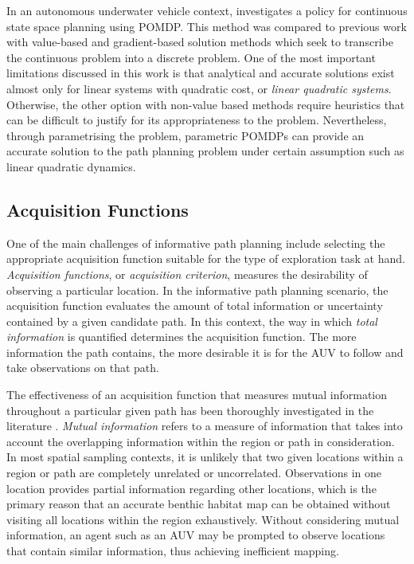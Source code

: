 			In an autonomous underwater vehicle context, \cite{ParametricPOMDP} investigates a policy for continuous state space planning using POMDP. This method was compared to previous work with value-based and gradient-based solution methods which seek to transcribe the continuous problem into a discrete problem. One of the most important limitations discussed in this work is that analytical and accurate solutions exist almost only for linear systems with quadratic cost, or \textit{linear quadratic systems}. Otherwise, the other option with non-value based methods require heuristics that can be difficult to justify for its appropriateness to the problem. Nevertheless, through parametrising the problem, parametric POMDPs can provide an accurate solution to the path planning problem under certain assumption such as linear quadratic dynamics.
		
		\subsection{Acquisition Functions}
		\label{Background:RelatedWork:AcquisitoinFunctions}
		
			One of the main challenges of informative path planning include selecting the appropriate acquisition function suitable for the type of exploration task at hand. \textit{Acquisition functions}, or \textit{acquisition criterion}, measures the desirability of observing a particular location. In the informative path planning scenario, the acquisition function evaluates the amount of total information or uncertainty contained by a given candidate path. In this context, the way in which \textit{total information} is quantified determines the acquisition function. The more information the path contains, the more desirable it is for the AUV to follow and take observations on that path. 
	
			The effectiveness of an acquisition function that measures mutual information throughout a particular given path has been thoroughly investigated in the literature \citep{AsherBender, Rigby:ROB20372, Krause:2008:NSP:1390681.1390689, Kapoor}. \textit{Mutual information} refers to a measure of information that takes into account the overlapping information within the region or path in consideration. In most spatial sampling contexts, it is unlikely that two given locations within a region or path are completely unrelated or uncorrelated. Observations in one location provides partial information regarding other locations, which is the primary reason that an accurate benthic habitat map can be obtained without visiting all locations within the region exhaustively. Without considering mutual information, an agent such as an AUV may be prompted to observe locations that contain similar information, thus achieving inefficient mapping.
			
